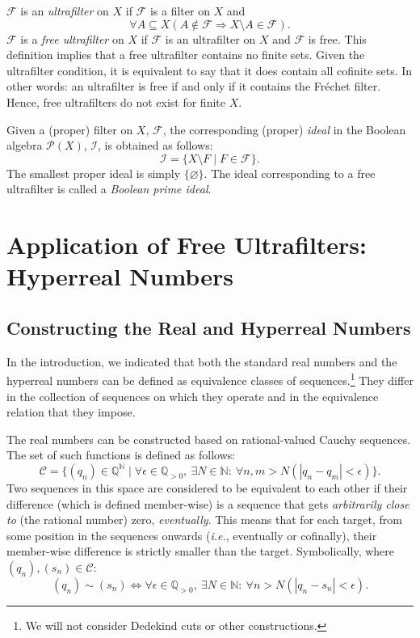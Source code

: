 $\mathcal{F}$ is an \textit{ultrafilter} on $X$ if $\mathcal{F}$ is a filter on $X$ and
$$\forall A \subseteq X (A \notin \mathcal{F} \Rightarrow X \setminus A \in \mathcal{F}).$$
$\mathcal{F}$ is a \textit{free ultrafilter} on $X$ if $\mathcal{F}$ is an ultrafilter on $X$ and $\mathcal{F}$ is free. This definition implies that a free ultrafilter contains no finite sets. Given the ultrafilter condition, it is equivalent to say that it does contain all cofinite sets. In other words: an ultrafilter is free if and only if it contains the Fr\'{e}chet filter.
Hence, free ultrafilters do not exist for finite $X$.

Given a (proper) filter on $X$, $\mathcal{F}$, the corresponding (proper) \textit{ideal} in the Boolean algebra $\mathcal{P}(X)$, $\mathcal{I}$, is obtained as follows:
$$\mathcal{I} = \{ X \setminus F \mid F \in \mathcal{F} \}.$$
The smallest proper ideal is simply $\{ \varnothing \}$. The ideal corresponding to a free ultrafilter is called a \textit{Boolean prime ideal}.

\section{Application of Free Ultrafilters: Hyperreal Numbers}\label{sec:hyperreal}
\subsection{Constructing the Real and Hyperreal Numbers}
In the introduction, we indicated that both the standard real numbers and the hyperreal numbers can be defined as equivalence classes of sequences.\footnote{We will not consider Dedekind cuts or other constructions.} They differ in the collection of sequences on which they operate and in the equivalence relation that they impose.

The real numbers can be constructed based on rational-valued Cauchy sequences. The set of such functions is defined as follows:
$$\mathcal{C} = \{ (q_n) \in \mathbb{Q}^\mathbb{N} \mid \forall \epsilon \in \mathbb{Q}_{> 0}, \ \exists N \in \mathbb{N}: \ \forall n,m > N \left( |q_n - q_m| < \epsilon \right) \} .$$
Two sequences in this space are considered to be equivalent to each other if their difference (which is defined member-wise) is a sequence that gets \textit{arbitrarily close to} (the rational number) zero, \textit{eventually}. This means that for each target, from some position in the sequences onwards (\textit{i.e.}, eventually or cofinally), their  member-wise difference is strictly smaller than the target. Symbolically, where $(q_n), (s_n) \in \mathcal{C}$:
$$(q_n) \sim (s_n) \Leftrightarrow \forall \epsilon \in \mathbb{Q}_{> 0}, \ \exists N \in \mathbb{N}: \ \forall n > N \left( |q_n - s_n| < \epsilon \right).$$


